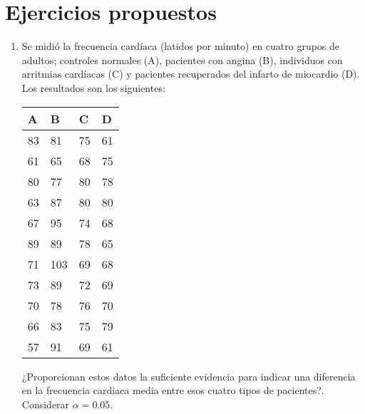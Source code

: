\section{Ejercicios propuestos}
\begin{enumerate}[leftmargin=*]

\item Se midió la frecuencia cardíaca (latidos por minuto) en
cuatro grupos de adultos; controles normales (A), pacientes con
angina (B), individuos con arritmias cardíacas (C) y pacientes
recuperados del infarto de miocardio (D). Los resultados son los
siguientes:

\begin{center}
\begin{tabular}{llll}
A & B & C & D \\
\hline
83 & 81 & 75 & 61 \\
61 & 65 & 68 & 75 \\
80 & 77 & 80 & 78 \\
63 & 87 & 80 & 80 \\
67 & 95 & 74 & 68 \\
89 & 89 & 78 & 65 \\
71 & 103 & 69 & 68 \\
73 & 89 & 72 & 69 \\
70 & 78 & 76 & 70 \\
66 & 83 & 75 & 79 \\
57 & 91 & 69 & 61 \\
\hline
\end{tabular}
\end{center}

¿Proporcionan estos datos la suficiente evidencia para indicar una
diferencia en la frecuencia cardiaca media entre esos cuatro tipos
de pacientes?. Considerar $\alpha=0.05$.



\end{enumerate}
